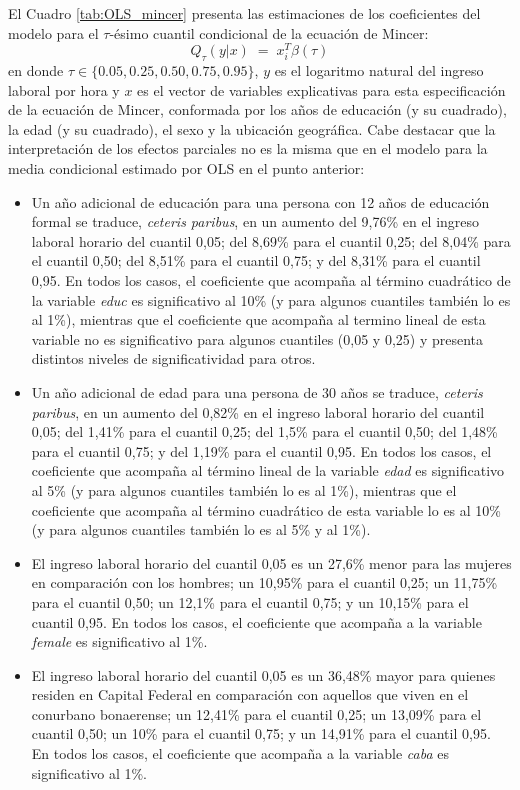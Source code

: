 \documentclass[12pt]{article}
\begin{document}
El Cuadro \ref{tab:OLS_mincer} presenta las estimaciones de los coeficientes del modelo para el $\tau$-ésimo cuantil condicional de la ecuación de Mincer:
\[
Q_{\tau}(y|x)\;=\;x_{i}^{T}\beta(\tau)
\]
en donde $\tau\in\{0.05,0.25,0.50,0.75,0.95\}$, $y$ es el logaritmo natural del ingreso laboral por hora y $x$ es el vector de variables explicativas para esta especificación de la ecuación de Mincer, conformada por los años de educación (y su cuadrado), la edad (y su cuadrado), el sexo y la ubicación geográfica. Cabe destacar que la interpretación de los efectos parciales no es la misma que en el modelo para la media condicional estimado por OLS en el punto anterior:
    \begin{itemize}
        \item Un año adicional de educación para una persona con 12 años de educación formal se traduce, \emph{ceteris paribus}, en un aumento del 9,76\% en el ingreso laboral horario del cuantil 0,05; del 8,69\% para el cuantil 0,25; del 8,04\% para el cuantil 0,50; del 8,51\% para el cuantil 0,75; y del 8,31\% para el cuantil 0,95. En todos los casos, el coeficiente que acompaña al término cuadrático de la variable \emph{educ} es significativo al 10\% (y para algunos cuantiles también lo es al 1\%), mientras que el coeficiente que acompaña al termino lineal de esta variable no es significativo para algunos cuantiles (0,05 y 0,25) y presenta distintos niveles de significatividad para otros.
        \item Un año adicional de edad para una persona de 30 años se traduce, \emph{ceteris paribus}, en un aumento del 0,82\% en el ingreso laboral horario del cuantil 0,05; del 1,41\% para el cuantil 0,25; del 1,5\% para el cuantil 0,50; del 1,48\% para el cuantil 0,75; y del 1,19\% para el cuantil 0,95. En todos los casos, el coeficiente que acompaña al término lineal de la variable \emph{edad} es significativo al 5\% (y para algunos cuantiles también lo es al 1\%), mientras que el coeficiente que acompaña al término cuadrático de esta variable lo es al 10\% (y para algunos cuantiles también lo es al 5\% y al 1\%). 
        \item El ingreso laboral horario del cuantil 0,05 es un 27,6\% menor para las mujeres en comparación con los hombres; un 10,95\% para el cuantil 0,25; un 11,75\% para el cuantil 0,50; un 12,1\% para el cuantil 0,75; y un 10,15\% para el cuantil 0,95. En todos los casos, el coeficiente que acompaña a la variable \emph{female} es significativo al 1\%.
        \item El ingreso laboral horario del cuantil 0,05 es un 36,48\% mayor para quienes residen en Capital Federal en comparación con aquellos que viven en el conurbano bonaerense; un 12,41\% para el cuantil 0,25; un 13,09\% para el cuantil 0,50; un 10\% para el cuantil 0,75; y un 14,91\% para el cuantil 0,95. En todos los casos, el coeficiente que acompaña a la variable \emph{caba} es significativo al 1\%.
    \end{itemize}
\end{document}
